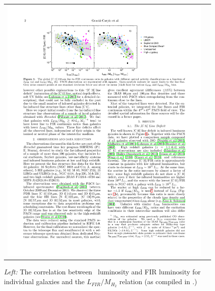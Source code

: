 \begin{figure}[h]
  \begin{tabular}{ll}
    \begin{minipage}{4.5in}
      \begin{center}
	\includegraphics[width=4.5in]{gracia-carpio11_fig1.pdf}
      \end{center}     
    \end{minipage} &
    \begin{minipage}{2in}
      \begin{center}
	\caption{\small {\it Left:} The correlation between \cii\ luminosity
and FIR luminosity for individual galaxies and the $L_{FIR}/M_{H_2}$
relation (as compiled in \citet{gracia-carpio11}.)}
      \end{center}
    \end{minipage}
  \end{tabular}
 
\label{fig:LCII-LFIR}
\end{figure}

